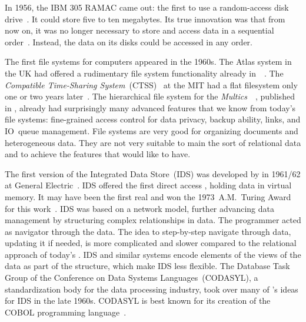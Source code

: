 In 1956, the IBM 305 RAMAC came out: the first to use a random-access disk drive~\cite{IRTFRADDRHBUCASTSFEFSFTE}.
It could store five to ten megabytes.
Its true innovation was that from now on, it was no longer necessary to store and access data in a sequential order~\cite{C20245YOQ}.
Instead, the data on its disks could be accessed in any order.

The first file systems for computers appeared in the 1960s.
The Atlas system in the UK had offered a rudimentary file system functionality already in~\citeyear{KPH1961TAS}~\cite{KPH1961TAS}.
The  \emph{Compatible Time-Sharing System}~(CTSS)~\cite{CMDDCHOK1963TCTSSAPG} at the MIT had a flat filesystem only one or two years later~\cite{OD1963TCCSLABTCDE}.
The hierarchical file system for the \emph{Multics}~~\cite{CV1965IAOOTMS}, published in \citeyear{DN1965AGPFSFSS}, already had surprisingly many advanced features that we know from today's file systems: fine-grained access control for data privacy, backup ability, links, and IO~queue management.
File systems are very good for organizing documents and heterogeneous data.
They are not very suitable to main the sort of relational data and to achieve the features that would like  to have.

The first version of the Integrated Data Store~(IDS) was developed by \citeauthor{B2009TOOTIDSITFDAD} in 1961/62 at General Electric~\cite{B2009TOOTIDSITFDAD,B1965SFRAP}.
IDS offered the first direct access , holding data in virtual memory.
It may have been the first real  and \citeauthor{B2009TOOTIDSITFDAD} won the 1973~A.M.~Turing Award for this work~\cite{H2016HCBITDAFOODW}.
IDS was based on a network model, further advancing data management by structuring complex relationships in data.
The programmer acted as navigator through the data.
The idea to step-by-step navigate through data, updating it if needed, is more complicated and slower compared to the relational approach of today's .
IDS and similar systems encode elements of the views of the data as part of the  structure, which make IDS less flexible.
The Database Task Group of the Conference on Data Systems Languages~(CODASYL), a standardization body for the data processing industry, took over many of \citeauthor{B2009TOOTIDSITFDAD}'s ideas for IDS in the late 1960s.
CODASYL is best known for its creation of the COBOL programming language~\cite{H2016HCBITDAFOODW}.

